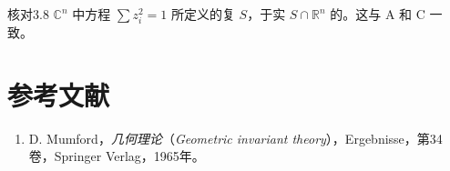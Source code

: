 \begin{SGAresult}{核对}{3.8}
$\mathbb C^n$ 中方程 $\sum z_i^2=1$ 所定义的复 $S$，于实 $S\cap\mathbb R^n$ 的。这与 A 和 C 一致。
\end{SGAresult}

\section*{参考文献}
\begin{enumerate}
\item D. Mumford，\emph{几何理论}（\emph{Geometric invariant theory}），Ergebnisse，第34卷，Springer Verlag，1965年。
\end{enumerate}
